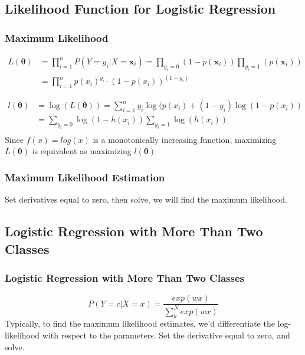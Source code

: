 \documentclass{beamer}
\begin{document}
\subsection{Likelihood Function for Logistic Regression}
\begin{frame}
\frametitle{Maximum Likelihood}

\begin{equation}
\begin{aligned}
L(\bm{\theta}) &= \prod_{i=1}^n P(Y = y_{i}  | X = \mathbf{x}_{i}) = \prod_{y_{i} = 0 } (1-p(\mathbf{x}_{i})) \prod_{y_{i} = 1 } (p(\mathbf{x}_{i})) \\
&= \prod_{i=1}^{n} p(x_{i})^{y_{i}} \cdot (1-p(x_{i}))^{(1-{y_{i}})}
\end{aligned}
\end{equation}

\begin{equation}
\begin{aligned}
l (\bm{\theta}) &=  \log (L(\bm{\theta}) ) = \sum_{i=1}^{n} y_{i} \log(p(x_{i}) + (1-y_{i}) \log(1-p(x_{i})) \\
&= \sum_{y_{i} = 0 } \log (1-h(x_{i})) \sum_{y_{i} = 1} \log (h(x_{i})) \\
\end{aligned}
\end{equation}
Since $f(x) = log(x)$ is a monotonically increasing function, maximizing $L(\bm{\theta})$ is equivalent as maximizing $l(\bm{\theta})$
\end{frame}
\begin{frame}
\frametitle{Maximum Likelihood Estimation}
Set derivatives equal to zero, then solve, we will find the maximum likelihood.

%
\end{frame}
\subsection{Logistic Regression with More Than Two Classes}
\begin{frame}
\frametitle{Logistic Regression with More Than Two Classes}
\begin{equation}
P(Y = c | X = x) = \frac{exp ({w x })}{ \sum_{k}^N exp(w x) }
\end{equation}
Typically, to find the maximum likelihood estimates, we'd differentiate the log-likelihood with respect to the parameters. Set the derivative equal to zero, and solve. 
\end{frame}
\end{document}
